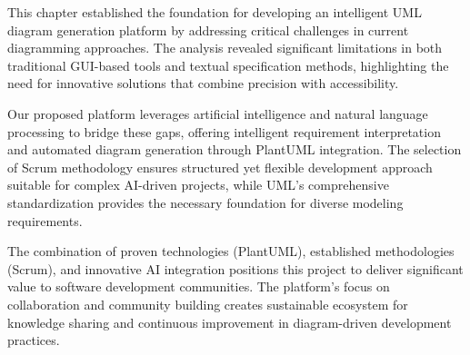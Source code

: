 This chapter established the foundation for developing an intelligent UML diagram generation platform by addressing critical challenges in current diagramming approaches. The analysis revealed significant limitations in both traditional GUI-based tools and textual specification methods, highlighting the need for innovative solutions that combine precision with accessibility.

Our proposed platform leverages artificial intelligence and natural language processing to bridge these gaps, offering intelligent requirement interpretation and automated diagram generation through PlantUML integration. The selection of Scrum methodology ensures structured yet flexible development approach suitable for complex AI-driven projects, while UML's comprehensive standardization provides the necessary foundation for diverse modeling requirements.

The combination of proven technologies (PlantUML), established methodologies (Scrum), and innovative AI integration positions this project to deliver significant value to software development communities. The platform's focus on collaboration and community building creates sustainable ecosystem for knowledge sharing and continuous improvement in diagram-driven development practices.
